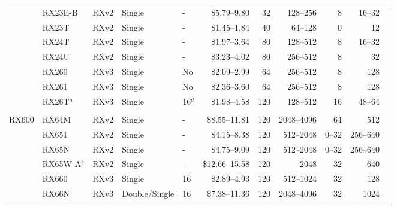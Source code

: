 \begin{table}
\begin{center}
\begin{tabular}{lllllrrrrrl}
       & RX23E-B        & RXv2   & Single         & -           & \$5.79--9.80     & 32       & 128--256    & 8            & 16--32   & \cite{rx_23eb}   \\
       & RX23T          & RXv2   & Single         & -           & \$1.45--1.84     & 40       & 64--128     & 0            & 12       & \cite{rx_23t}    \\
       & RX24T          & RXv2   & Single         & -           & \$1.97--3.64     & 80       & 128--512    & 8            & 16--32   & \cite{rx_24t}    \\
       & RX24U          & RXv2   & Single         & -           & \$3.23--4.02     & 80       & 256--512    & 8            & 32       & \cite{rx_24u}    \\
       & RX260          & RXv3   & Single         & No          & \$2.09--2.99     & 64       & 256--512    & 8            & 128      & \cite{rx_260}    \\
       & RX261          & RXv3   & Single         & No          & \$2.36--3.60     & 64       & 256--512    & 8            & 128      & \cite{rx_260}    \\
       & RX26T$^{a}$    & RXv3   & Single         & 16$^{d}$    & \$1.98--4.58     & 120      & 128--512    & 16           & 48--64   & \cite{rx_26t}    \\
       &                &        &                &             &                  &          &             &              &          &                  \\
RX600  & RX64M          & RXv2   & Single         & -           & \$8.55--11.81    & 120      & 2048--4096  & 64           & 512      & \cite{rx_64M}    \\
       & RX651          & RXv2   & Single         & -           & \$4.15--8.38     & 120      & 512--2048   & 0--32        & 256--640 & \cite{rx_65n}    \\
       & RX65N          & RXv2   & Single         & -           & \$4.75--9.09     & 120      & 512--2048   & 0--32        & 256--640 & \cite{rx_65n}    \\
       & RX65W-A$^{b}$  & RXv2   & Single         & -           & \$12.66--15.58   & 120      & 2048        & 32           & 640      & \cite{rx_65wa}   \\
       & RX660          & RXv3   & Single         & 16          & \$2.89--4.93     & 120      & 512--1024   & 32           & 128      & \cite{rx_660}    \\
       & RX66N          & RXv3   & Double/Single  & 16          & \$7.38--11.36    & 120      & 2048--4096  & 32           & 1024     & \cite{rx_66n}    \\

\end{tabular}
\end{center}
\end{table}
